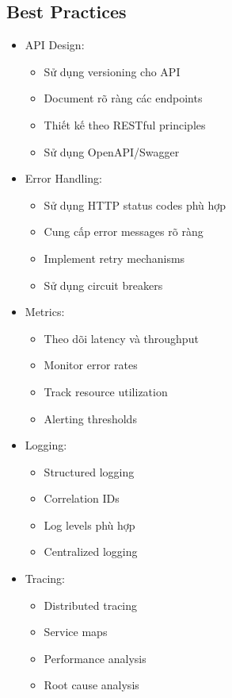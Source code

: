 \subsection{Best Practices}
\begin{itemize}
    \item API Design:
    \begin{itemize}
        \item Sử dụng versioning cho API
        \item Document rõ ràng các endpoints
        \item Thiết kế theo RESTful principles
        \item Sử dụng OpenAPI/Swagger
    \end{itemize}
    
    \item Error Handling:
    \begin{itemize}
        \item Sử dụng HTTP status codes phù hợp
        \item Cung cấp error messages rõ ràng
        \item Implement retry mechanisms
        \item Sử dụng circuit breakers
    \end{itemize}
\end{itemize}

\begin{itemize}
    \item Metrics:
    \begin{itemize}
        \item Theo dõi latency và throughput
        \item Monitor error rates
        \item Track resource utilization
        \item Alerting thresholds
    \end{itemize}
    
    \item Logging:
    \begin{itemize}
        \item Structured logging
        \item Correlation IDs
        \item Log levels phù hợp
        \item Centralized logging
    \end{itemize}
    
    \item Tracing:
    \begin{itemize}
        \item Distributed tracing
        \item Service maps
        \item Performance analysis
        \item Root cause analysis
    \end{itemize}
\end{itemize}

